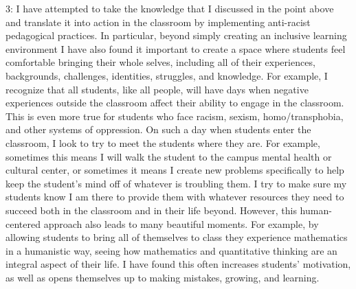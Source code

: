 \documentclass[11pt]{article}
\begin{document}
3: I have attempted to take the knowledge that I discussed in the point above and translate it into action in the classroom by implementing anti-racist pedagogical practices. In particular, beyond simply creating an inclusive learning environment I have also found it important to create a space where students feel comfortable bringing their whole selves, including all of their experiences, backgrounds, challenges, identities, struggles, and knowledge. For example, I recognize that all students, like all people, will have days when negative experiences outside the classroom affect their ability to engage in the classroom. This is even more true for students who face racism, sexism, homo/transphobia, and other systems of oppression. On such a day when students enter the classroom, I look to try to meet the students where they are. For example, sometimes this means I will walk the student to the campus mental health or cultural center, or sometimes it means I create new problems specifically to help keep the student's mind off of whatever is troubling them. I try to make sure my students know I am there to provide them with whatever resources they need to succeed both in the classroom and in their life beyond. However, this human-centered approach also leads to many beautiful moments. For example, by allowing students to bring all of themselves to class they experience mathematics in a humanistic way, seeing how mathematics and quantitative thinking are an integral aspect of their life. I have found this often increases students' motivation, as well as opens themselves up to making mistakes, growing, and learning. 
\end{document}

